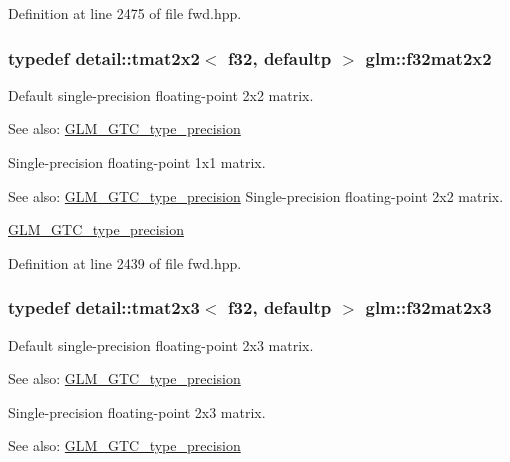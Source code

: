 Definition at line 2475 of file fwd.hpp.\hypertarget{group__gtc__type__precision_g4eb16d89ecff72fa77f10c9a1e7ca475}{
\subsubsection[f32mat2x2]{\setlength{\rightskip}{0pt plus 5cm}typedef detail::tmat2x2$<$ f32, defaultp $>$ {\bf glm::f32mat2x2}}}
\label{group__gtc__type__precision_g4eb16d89ecff72fa77f10c9a1e7ca475}


Default single-precision floating-point 2x2 matrix. \begin{Desc}
\item[See also:]\hyperlink{group__gtc__type__precision}{GLM\_\-GTC\_\-type\_\-precision}\end{Desc}
Single-precision floating-point 1x1 matrix. \begin{Desc}
\item[See also:]\hyperlink{group__gtc__type__precision}{GLM\_\-GTC\_\-type\_\-precision} Single-precision floating-point 2x2 matrix. 

\hyperlink{group__gtc__type__precision}{GLM\_\-GTC\_\-type\_\-precision} \end{Desc}


Definition at line 2439 of file fwd.hpp.\hypertarget{group__gtc__type__precision_g5ad96c3a7d4c81520d1f30bf5dcdc2b6}{
\subsubsection[f32mat2x3]{\setlength{\rightskip}{0pt plus 5cm}typedef detail::tmat2x3$<$ f32, defaultp $>$ {\bf glm::f32mat2x3}}}
\label{group__gtc__type__precision_g5ad96c3a7d4c81520d1f30bf5dcdc2b6}


Default single-precision floating-point 2x3 matrix. \begin{Desc}
\item[See also:]\hyperlink{group__gtc__type__precision}{GLM\_\-GTC\_\-type\_\-precision}\end{Desc}
Single-precision floating-point 2x3 matrix. \begin{Desc}
\item[See also:]\hyperlink{group__gtc__type__precision}{GLM\_\-GTC\_\-type\_\-precision} \end{Desc}


